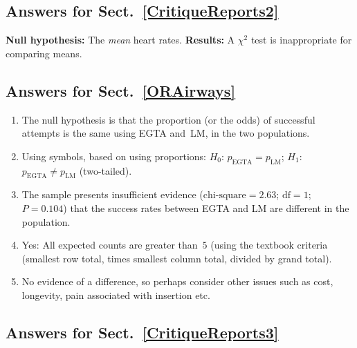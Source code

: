 \documentclass[
  11pt,
  a4paper,
  krantz2]{krantz}
\providecommand{\tightlist}{%
  \setlength{\itemsep}{0pt}\setlength{\parskip}{0pt}}
\begin{document}
\begin{footnotesize}
\subsection*{Answers for Sect.~\ref{CritiqueReports2}}\label{answers-for-sect.-refcritiquereports2}

\textbf{Null hypothesis:} The \emph{mean} heart rates.
\textbf{Results:} A \(\chi^2\) test is inappropriate for comparing means.

\subsection*{Answers for Sect.~\ref{ORAirways}}\label{answers-for-sect.-reforairways}

\begin{enumerate}
\def\labelenumi{\arabic{enumi}.}
\tightlist
\item
  The null hypothesis is that the proportion (or the odds) of successful attempts is the same using EGTA and~LM, in the two populations.
\item
  Using symbols, based on using proportions: \(H_0\): \(p_{\text{EGTA}} = p_{\text{LM}}\); \(H_1\): \(p_{\text{EGTA}} \ne p_{\text{LM}}\) (two-tailed).
\item
  The sample presents insufficient evidence (\(\text{chi-square}=2.63\); \(\text{df}=1\); \(P=0.104\)) that the success rates between EGTA and LM are different in the population.
\item
  Yes: All expected counts are greater than~\(5\) (using the textbook criteria (smallest row total, times smallest column total, divided by grand total).
\item
  No evidence of a difference, so perhaps consider other issues such as cost, longevity, pain associated with insertion etc.
\end{enumerate}

\subsection*{Answers for Sect.~\ref{CritiqueReports3}}\label{answers-for-sect.-refcritiquereports3}


\end{footnotesize}
\end{document}
